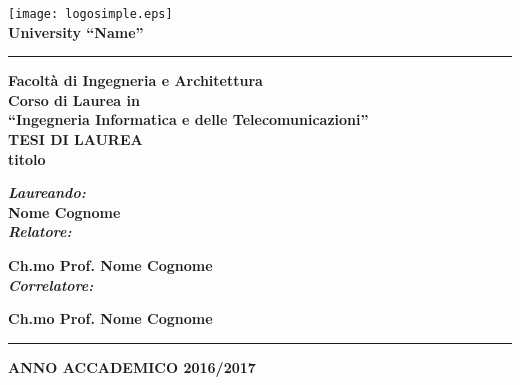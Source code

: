 \begin{titlepage}
 \begin{center}
     \texttt{[image: logosimple.eps]}\\
     \vspace{1em}
     \Large{ \textbf  {University 
		\textquotedblleft Name\textquotedblright}}\\
 \hrule 
\vspace{0.3em}
      \large{ \textbf{Facolt\`{a} di Ingegneria e Architettura}}\\
     \normalsize{\textbf{Corso di Laurea in \\
     \textquotedblleft Ingegneria Informatica e delle Telecomunicazioni\textquotedblright}}\\
    
     \vspace{2.6cm}
     \Large{ \textbf{TESI DI LAUREA}}\\
		\vspace{2em}
     \large{ \textbf{titolo}}\\
 \end{center}

\vskip 1.5cm
  \noindent \small{\textbf{\textit{Laureando:}}}\\
     \noindent \textbf{Nome Cognome}\\
 
   \hspace{225pt} \small{\textbf{\textit{Relatore:}}}
  
   \hspace{225pt} \textbf{Ch.mo Prof. Nome Cognome}\\

   \hspace{225pt} \small{\textbf{\textit{Correlatore:}}}
   
   \hspace{225pt} \textbf{Ch.mo Prof. Nome Cognome}
   
\vskip 1.5cm
\begin{center}
\hrule
\vspace{0.2em}
\textbf{ANNO ACCADEMICO 2016/2017}
\end{center}
\end{titlepage}

\clearpage{\pagestyle{empty}\cleardoublepage}

\clearpage{\pagestyle{empty}\cleardoublepage}
